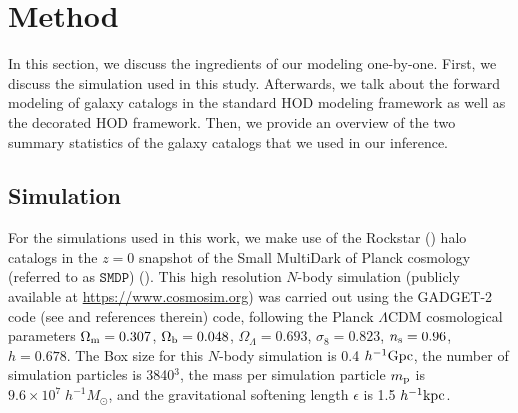 \section{Method}\label{sec:method}

In this section, we discuss the ingredients of our modeling one-by-one. First, we discuss the simulation used in this study. Afterwards, we talk about the forward modeling of galaxy catalogs in the standard HOD modeling framework as well as the decorated HOD framework. Then, we provide an overview of the two summary statistics of the galaxy catalogs that we used in our inference.  

\subsection{Simulation}

For the simulations used in this work, we make use of the Rockstar (\citealt{rockstar}) halo catalogs in the $z=0$ snapshot of the Small MultiDark of Planck cosmology (referred to as $\mathtt{SMDP}$) (\citealt{smallmultidark}). This high resolution $N$-body simulation (publicly available at \url{https://www.cosmosim.org}) was carried out using the GADGET-2 code 
(see \citealt{smallmultidark} and references therein) code, following the Planck $\Lambda$CDM cosmological parameters 
$\Omega_{\rm m} = 0.307$, $\Omega_{\rm b} = 0.048$, $\Omega_{\Lambda} = 0.693$, $\sigma_{8} = 0.823$, $n_{\rm s}=0.96$, 
$h=0.678$. The Box size for this $N$-body simulation is 0.4 $h^{-1} \rm{Gpc}$, the number of simulation particles is 3840$^3$, the mass per simulation particle $m_{\rm p}$ is $9.6 \times 10^{7} \; h^{-1} M_{\odot}$, and the gravitational softening length $\epsilon$ is 1.5 $h^{-1} \rm{kpc}$.

